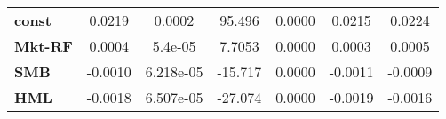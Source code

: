 \begin{center}
\begin{tabular}{lcccccc}
\midrule
\textbf{const}  &       0.0219       &       0.0002       &      95.496     &      0.0000      &       0.0215      &       0.0224       \\
\textbf{Mkt-RF} &       0.0004       &       5.4e-05      &      7.7053     &      0.0000      &       0.0003      &       0.0005       \\
\textbf{SMB}    &      -0.0010       &     6.218e-05      &     -15.717     &      0.0000      &      -0.0011      &      -0.0009       \\
\textbf{HML}    &      -0.0018       &     6.507e-05      &     -27.074     &      0.0000      &      -0.0019      &      -0.0016       \\
\bottomrule
\end{tabular}
\end{center}
